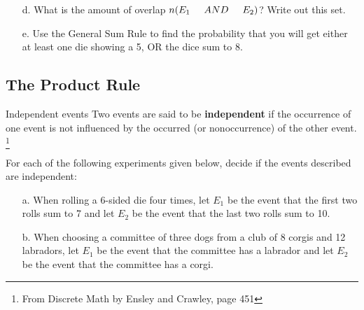 {\begin{questionNOGRADE}{\thequestion}
\begin{itemize}
            \item[d.]   What is the amount of overlap $n(E_1 \tab[0.5cm]AND\tab[0.5cm] E_2)$? Write out this set.
                        ~\\ \vspace{.5cm}

            \item[e.]   Use the General Sum Rule to find the probability that you will get either at least one die showing a 5, OR the dice sum to 8.
                        ~\\
        \end{itemize}

    \end{questionNOGRADE}

    \subsection{The Product Rule}
        \begin{intro}{Independent events}
            Two events are said to be \textbf{independent} if the occurrence
            of one event is not influenced by the occurred (or nonoccurrence)
            of the other event.
            \footnote{From Discrete Math by Ensley and Crawley, page 451}
        \end{intro}
    
    \begin{questionNOGRADE}{\thequestion}
        For each of the following experiments given below,
        decide if the events described are independent:

        \begin{itemize}
            \item[a.] When rolling a 6-sided die four times, let $E_{1}$
                be the event that the first two rolls sum to 7 and let $E_{2}$
                be the event that the last two rolls sum to 10. ~\\ \vspace{1cm}

            \item[b.] When choosing a committee of three dogs from a club of
                8 corgis and 12 labradors, let $E_{1}$ be the event that
                the committee has a labrador and let $E_{2}$ be the
                event that the committee has a corgi. ~\\ \vspace{1cm}
        \end{itemize}        
    \end{questionNOGRADE}

}
